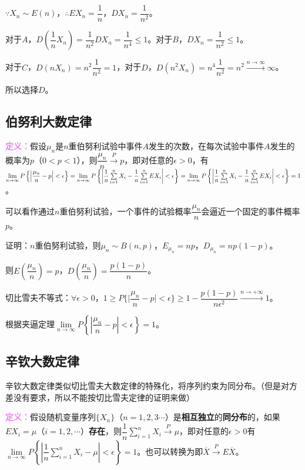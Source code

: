 $\because X_n\sim E(n)$，$\therefore EX_n=\dfrac{1}{n}$，$DX_n=\dfrac{1}{n^2}$。

对于$A$，$D\left(\dfrac{1}{n}X_n\right)=\dfrac{1}{n^2}DX_n=\dfrac{1}{n^4}\leqslant1$。对于$B$，$DX_n=\dfrac{1}{n^2}\leqslant1$。

对于$C$，$D(nX_n)=n^2\dfrac{1}{n^2}=1$，对于$D$，$D(n^2X_n)=n^4\dfrac{1}{n^2}=n^2\overset{n\to\infty}{\longrightarrow}\infty$。

所以选择$D$。

\subsection{伯努利大数定律}

\textcolor{violet}{\textbf{定义：}}假设$\mu_n$是$n$重伯努利试验中事件$A$发生的次数，在每次试验中事件$A$发生的概率为$p$（$0<p<1$），则$\dfrac{\mu_n}{n}\overset{P}{\longrightarrow}p$，即对任意的$\epsilon>0$，有$\lim\limits_{n\to\infty}P\left\{\left\vert\dfrac{\mu_n}{n}-p\right\vert<\epsilon\right\}=\lim\limits_{n\to\infty}P\left\{\left\vert\dfrac{1}{n}\sum\limits_{i=1}^nX_i-\dfrac{1}{n}\sum\limits_{i=1}^nEX_i\right\vert<\epsilon\right\}=\lim\limits_{n\to\infty}P\\\left\{\left\vert\dfrac{1}{n}\sum\limits_{i=1}^nX_i-\dfrac{1}{n}\sum\limits_{i=1}^nEX_i\right\vert<\epsilon\right\}=1$。

可以看作通过$n$重伯努利试验，一个事件的试验概率$\dfrac{\mu_n}{n}$会逼近一个固定的事件概率$p$。

证明：$n$重伯努利试验，则$\mu_n\sim B(n,p)$，$E_{\mu_n}=np$，$D_{\mu_n}=np(1-p)$。

则$E\left(\dfrac{\mu_n}{n}\right)=p$，$D\left(\dfrac{\mu_n}{n}\right)=\dfrac{p(1-p)}{n}$。

切比雪夫不等式：$\forall\epsilon>0$，$1\geqslant P\{\vert\dfrac{\mu_n}{n}-p\vert<\epsilon\}\geqslant1-\dfrac{p(1-p)}{n\epsilon^2}\xrightarrow{n\to+\infty}1$。

根据夹逼定理$\lim\limits_{n\to\infty}P\left\{\left\vert\dfrac{\mu_n}{n}-p\right\vert<\epsilon\right\}=1$。

\subsection{辛钦大数定律}

辛钦大数定律类似切比雪夫大数定律的特殊化，将序列约束为同分布。（但是对方差没有要求，所以不能按切比雪夫定律的证明来做）

\textcolor{violet}{\textbf{定义：}}假设随机变量序列$\{X_n\}$（$n=1,2,3\cdots$）是\textbf{相互独立}的\textbf{同分布}的，如果$EX_i=\mu$（$i=1,2,\cdots$）\textbf{存在}，则$\dfrac{1}{n}\sum\limits_{i=1}^nX_i\overset{P}{\longrightarrow}\mu$，即对任意的$\epsilon>0$有$\lim\limits_{n\to\infty}P\left\{\left\vert\dfrac{1}{n}\sum\limits_{i=1}^nX_i-\mu\right\vert<\epsilon\right\}=1$。也可以转换为即$\overline{X}\overset{P}{\rightarrow}E\overline{X}$。\medskip

